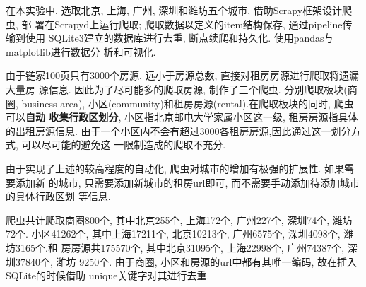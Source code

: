 在本实验中, 选取北京, 上海, 广州, 深圳和潍坊五个城市, 借助Scrapy框架设计爬虫, 部
署在Scrapyd上运行爬取; 爬取数据以定义的item结构保存, 通过pipeline传输到使用
SQLite3建立的数据库进行去重, 断点续爬和持久化. 使用pandas与matplotlib进行数据分
析和可视化.

由于链家100页只有3000个房源, 远小于房源总数, 直接对租房房源进行爬取将遗漏大量房
源信息. 因此为了尽可能多的爬取房源, 制作了三个爬虫. 分别爬取板块(商圈, business
area), 小区(community)和租房房源(rental).在爬取板块的同时, 爬虫可以\textbf{自动
收集行政区划分}, 小区指北京邮电大学家属小区这一级, 租房房源指具体的出租房源信息.
由于一个小区内不会有超过3000各租房房源,因此通过这一划分方式, 可以尽可能的避免这
一限制造成的爬取不充分.

由于实现了上述的较高程度的自动化, 爬虫对城市的增加有极强的扩展性. 如果需要添加新
的城市, 只需要添加新城市的租房url即可, 而不需要手动添加待添加城市的具体行政区划
等信息.

爬虫共计爬取商圈800个, 其中北京255个, 上海172个, 广州227个, 深圳74个, 潍坊72个.
小区41262个, 其中上海17211个, 北京10213个, 广州6575个, 深圳4098个, 潍坊3165个.租
房房源共175570个, 其中北京31095个, 上海22998个, 广州74387个, 深圳37840个, 潍坊
9250个. 由于商圈, 小区和房源的url中都有其唯一编码, 故在插入SQLite的时候借助
unique关键字对其进行去重.